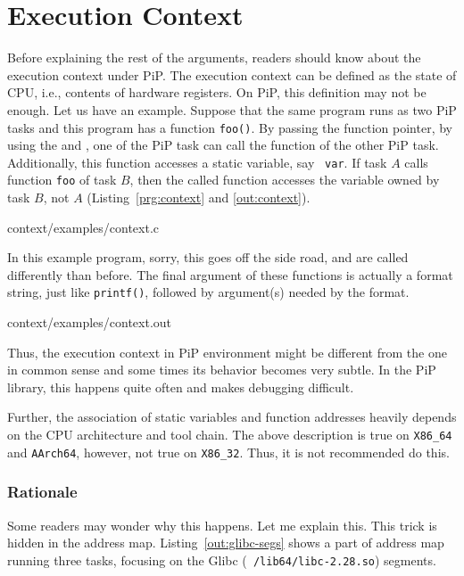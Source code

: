\section{Execution Context}

Before explaining the rest of the arguments, readers should know about
the execution context under PiP. The execution context can be defined
as the state of CPU, i.e., contents of hardware registers. On PiP,
this definition may not be enough. Let us have an example. Suppose
that the same program runs as two PiP tasks and this program has a
function {\tt foo()}. By passing the function pointer, by using the
 and , one of
the PiP task can call the function of the other PiP
task. Additionally, this function accesses a static variable, say {\tt
  var}. If task $A$ calls function {\tt foo} of task $B$, then the
called function accesses the variable owned by task $B$, not $A$
(Listing~\ref{prg:context} and \ref{out:context}).

 {context/examples/context.c}

In this example program, sorry, this goes off the side road,
 and 
 are called differently than
before. The final argument of these functions is actually a format
string, just like {\tt printf()}, followed by argument(s) needed by
the format. 


                {context/examples/context.out}

Thus, the execution context in PiP environment might be different from
the one in common sense and some times its behavior becomes very
subtle. In the PiP library, this happens quite often and makes
debugging difficult. 

Further, the association of static variables and function addresses
heavily depends on the CPU architecture and tool chain. The above
description is true on {\tt X86_64} and {\tt AArch64}, however, not
true on {\tt X86_32}. Thus, it is not recommended do this.

\subsubsection*{Rationale}

Some readers may wonder why this happens. Let me explain this. This
trick is hidden in the address map. Listing~\ref{out:glibc-segs} shows
a part of address map running three tasks, focusing on the Glibc ({\tt
  /lib64/libc-2.28.so}) segments. 

